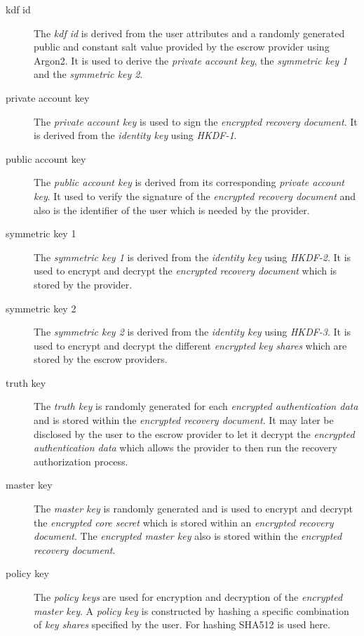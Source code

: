 \begin{description}
	\item[kdf id] {The {\em kdf id} is derived from the user attributes and a
	randomly generated public and constant salt value provided by the escrow provider using Argon2. It is used to derive
	the {\em private account key}, the {\em symmetric key 1} and the {\em symmetric key 2}.}
	\item[private account key] {The {\em private account key} is used to sign the {\em encrypted
	recovery document}. It is derived from the {\em identity key} using {\em HKDF-1}}.
	\item[public account key] {The {\em public account key} is derived from its corresponding
	{\em private account key}. It used to verify the signature of the {\em encrypted recovery
	document} and also is the identifier of the user which is needed by the provider.}
	\item[symmetric key 1] {The {\em symmetric key 1} is derived from the {\em identity key} using
	{\em HKDF-2}. It is used to encrypt and decrypt the {\em encrypted recovery document} which is stored by
	the provider.}
	\item[symmetric key 2] {The {\em symmetric key 2} is derived from the {\em identity key} using
	{\em HKDF-3}. It is used to encrypt and decrypt the different {\em encrypted key shares} which
	are stored by the escrow providers.}
	\item[truth key] {The {\em truth key} is randomly generated for each {\em encrypted authentication data}
	  and is stored within the {\em encrypted recovery document}. It may later be disclosed by the user to
          the escrow provider to let it decrypt the {\em encrypted authentication data} which allows the provider
          to then run the recovery authorization process.}
	\item[master key] {The {\em master key} is randomly generated and is used to encrypt and decrypt the
	{\em encrypted core secret} which is stored within an {\em encrypted recovery document}. The {\em encrypted master key} also is stored within the {\em encrypted recovery document}.}
	\item[policy key] {The {\em policy keys} are used for encryption and decryption of the {\em encrypted master key}. A {\em policy key} is constructed by hashing a specific combination of {\em key shares} specified by the
	user. For hashing SHA512 is used here.}
\end{description}
\newpage


